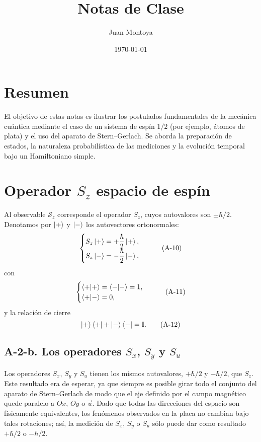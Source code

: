 \documentclass[a4paper,11pt]{article}
\title{Notas de Clase}
\author{Juan Montoya}
\date{\today}
\begin{document}
\maketitle

\section*{Resumen}
El objetivo de estas notas es ilustrar los postulados fundamentales de la mecánica cuántica mediante el caso de un sistema de espín $1/2$ (por ejemplo, átomos de plata) y el uso del aparato de Stern–Gerlach. Se aborda la preparación de estados, la naturaleza probabilística de las mediciones y la evolución temporal bajo un Hamiltoniano simple.

\section{Operador \texorpdfstring{$S_z$} y espacio de espín}
Al observable $\mathcal{S}_z$ corresponde el operador $S_z$, cuyos autovalores son $\pm\hbar/2$. Denotamos por $\ket{+}$ y $\ket{-}$ los autovectores ortonormales:
\begin{equation}
    \begin{cases}
    S_z \ket{+} = +\dfrac{\hbar}{2}\ket{+},\\
    S_z \ket{-} = -\dfrac{\hbar}{2}\ket{-},
    \end{cases}
\tag{A-10}
\end{equation}
con
\begin{equation}
    \begin{cases}
    \braket{+|+} = \braket{-|-} = 1,\\
    \braket{+|-} = 0,
    \end{cases}
\tag{A-11}
\end{equation}
y la relación de cierre
\begin{equation}
\ket{+}\bra{+} + \ket{-}\bra{-} = \mathbb{I}.
\tag{A-12}
\end{equation}

\subsection*{A-2-b. Los operadores $S_x$, $S_y$ y $S_u$}
Los operadores $S_x$, $S_y$ y $S_u$ tienen los mismos autovalores, $+\hbar/2$ y $-\hbar/2$, que $S_z$. Este resultado era de esperar, ya que siempre es posible girar todo el conjunto del aparato de Stern–Gerlach de modo que el eje definido por el campo magnético quede paralelo a $Ox$, $Oy$ o $\vec u$. Dado que todas las direcciones del espacio son físicamente equivalentes, los fenómenos observados en la placa no cambian bajo tales rotaciones; así, la medición de $S_x$, $S_y$ o $S_u$ sólo puede dar como resultado $+\hbar/2$ o $-\hbar/2$.
\end{document}
